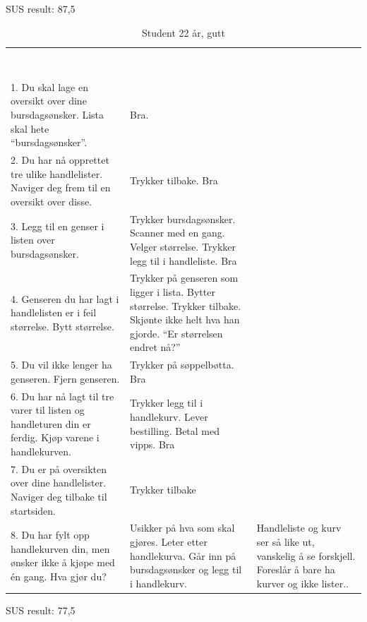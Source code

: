 \noindent SUS result: 87,5

\begin{table}[H]
    \caption{Student 22 år, gutt}
    \label{tab:observasjon1_3}
    \centering
   \begin{tabular}{|L{15em}  L{15em} L{15em}|}
    \hline
        \textbf{\textcolor{white}{Task}} & \textbf{\textcolor{white}{Obeservation during execution}} & \textbf{\textcolor{white}{Conversation and discussion}}\\
        1. Du skal lage en oversikt over dine bursdagsønsker. Lista skal hete “bursdagsønsker”. & Bra. & \\
        2. Du har nå opprettet tre ulike handlelister. Naviger deg frem til en oversikt over disse. & Trykker tilbake. Bra &  \\
        3. Legg til en genser i listen over bursdagsønsker. & Trykker bursdagsønsker. Scanner med en gang. Velger størrelse. Trykker legg til i handleliste. Bra & \\
        4. Genseren du har lagt i handlelisten er i feil størrelse. Bytt størrelse. & Trykker på genseren som ligger i lista. Bytter størrelse. Trykker tilbake. Skjønte ikke helt hva han gjorde. “Er størrelsen endret nå?” & \\
        5. Du vil ikke lenger ha genseren. Fjern genseren. & Trykker på søppelbøtta. Bra & \\
        6. Du har nå lagt til tre varer til listen og handleturen din er ferdig. Kjøp varene i handlekurven. & Trykker legg til i handlekurv. Lever bestilling. Betal med vipps. Bra & \\
        7. Du er på oversikten over dine handlelister. Naviger deg tilbake til startsiden. & Trykker tilbake & \\
        8. Du har fylt opp handlekurven din, men ønsker ikke å kjøpe med én gang. Hva gjør du? & Usikker på hva som skal gjøres. Leter etter handlekurva. Går inn på bursdagsønsker og legg til i handlekurv. & Handleliste og kurv ser så like ut, vanskelig å se forskjell. Foreslår å bare ha kurver og ikke lister..\\
        \hline
    \end{tabular}
\end{table}

\noindent SUS result: 77,5

